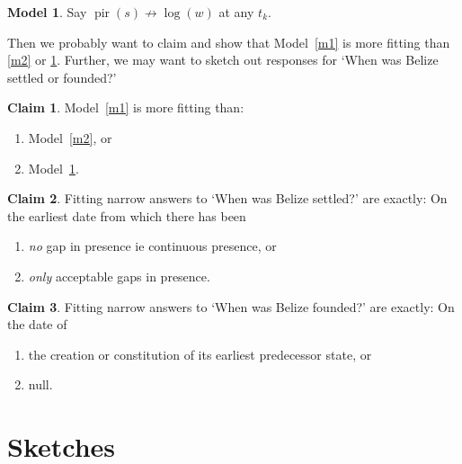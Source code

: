 \documentclass{amsart}
\DeclareMathOperator{\pir}{pir}%
\theoremstyle{definition}%
\newtheorem{model}{Model}
\theoremstyle{definition}%
\newtheorem{claim}{Claim}
\begin{document}
%
%
\begin{model}
\label{m3}
Say \(\pir(s)\not\to\log(w)\) at any \(t_{k}\). %
\end{model}
%
%
Then we probably want to claim and show that Model~\ref{m1} is more fitting than \ref{m2} or \ref{m3}. %
Further, we may want to sketch out responses for `When was Belize settled or founded?'%
%
%
\begin{claim}
\label{c1}
Model~\ref{m1} is more fitting than: 
\begin{enumerate}[1.]%
\item Model~\ref{m2}, or 
\item Model~\ref{m3}.
\end{enumerate}
\end{claim}
%
%
\begin{claim}
\label{c2}
Fitting narrow answers to `When was Belize settled?' are exactly: On the earliest date from which there has been%
\begin{enumerate}[1.]
\item \emph{no} gap in presence ie continuous presence, or%
\item \emph{only} acceptable gaps in presence.%
\end{enumerate}
\end{claim}
%
%
\begin{claim}
\label{c3}
Fitting narrow answers to `When was Belize founded?' are exactly: On the date of
\begin{enumerate}[1.]
\item the creation or constitution of its earliest predecessor state, or%
\item null.
\end{enumerate}
\end{claim}
%
%
%
%
\section{Sketches}
\label{s:sketches}
\end{document}
